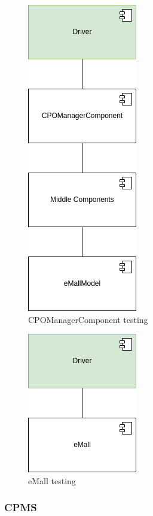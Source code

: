 \begin{figure}[H]
    \centering
    \includegraphics[keepaspectratio]{Testing/emall/cpomanager.png}
    \caption{\ac{CPO}ManagerComponent testing}
\end{figure}
\begin{figure}[H]
    \centering
    \includegraphics[keepaspectratio]{Testing/emall/emall.png}
    \caption{\ac{eMall} testing}
\end{figure}
\subsubsection{CPMS}

